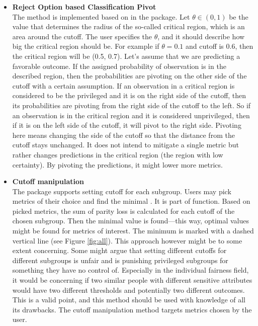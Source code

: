 \begin{itemize}
\tightlist
\item
  \textbf{Reject Option based Classification Pivot}\\
  The  method is implemented based on
  \citet{postKamiran} in the  package. Let
  \(\theta \in (0,1)\) be the value that determines the radius of the
  so-called critical region, which is an area around the cutoff. The
  user specifies the \(\theta\), and it should describe how big the
  critical region should be. For example if \(\theta = 0.1\) and cutoff
  is 0.6, then the critical region will be (0.5, 0.7). Let's assume that
  we are predicting a favorable outcome. If the assigned probability of
  observation is in the described region, then the probabilities are
  pivoting on the other side of the cutoff with a certain assumption. If
  an observation in a critical region is considered to be the privileged
  and it is on the right side of the cutoff, then its probabilities are
  pivoting from the right side of the cutoff to the left. So if an
  observation is in the critical region and it is considered
  unprivileged, then if it is on the left side of the cutoff, it will
  pivot to the right side. Pivoting here means changing the side of the
  cutoff so that the distance from the cutoff stays unchanged. It does
  not intend to mitigate a single metric but rather changes predictions
  in the critical region (the region with low certainty). By pivoting
  the predictions, it might lower more metrics.\\
\item
  \textbf{Cutoff manipulation}\\
  The  package supports setting cutoff for each
  subgroup. Users may pick  metrics of their choice
  and find the minimal . It is part of
   function. Based on picked metrics,
  the sum of parity loss is calculated for each cutoff of the chosen
  subgroup. Then the minimal value is found---this way, optimal values
  might be found for metrics of interest. The minimum is marked with a
  dashed vertical line (see Figure \ref{fig:all}). This approach however
  might be to some extent concerning. Some might argue that setting
  different cutoffs for different subgroups is unfair and is punishing
  privileged subgroups for something they have no control of. Especially
  in the individual fairness field, it would be concerning if two
  similar people with different sensitive attributes would have two
  different thresholds and potentially two different outcomes. This is a
  valid point, and this method should be used with knowledge of all its
  drawbacks. The cutoff manipulation method targets metrics chosen by
  the user.
\end{itemize}

